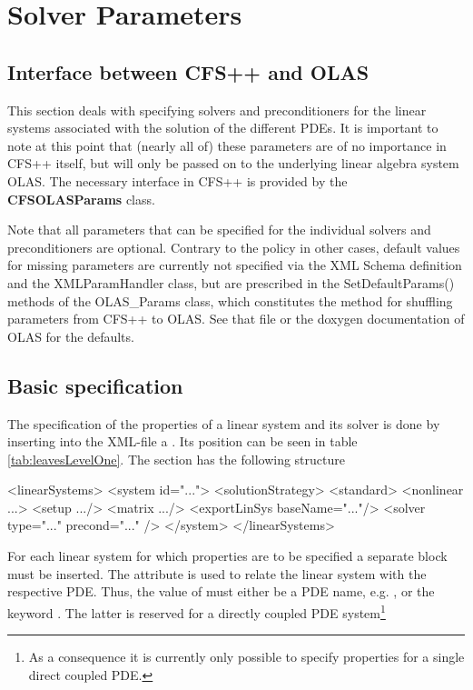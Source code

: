 %
%
\chapter{Solver Parameters}
%
%
\section{Interface between CFS++ and OLAS}
\label{sec:SP_Interface}
%
%
This section deals with specifying solvers and preconditioners for the linear
systems associated with the solution of the different PDEs. It is important to
note at this point that (nearly all of) these parameters are of no importance
in CFS++ itself, but will only be passed on to the underlying linear algebra
system OLAS. The necessary interface in CFS++ is provided by the 
\textbf{CFSOLASParams} class.

Note that all parameters that can be specified for the individual solvers and
preconditioners are optional. Contrary to the policy in other cases,
default values for missing parameters are currently not specified via the XML
Schema definition and the XMLParamHandler class, but are prescribed in the
SetDefaultParams() methods of the OLAS\_Params class, which constitutes the
method for shuffling parameters from CFS++ to OLAS. See that file or the
doxygen documentation of OLAS for the defaults.
%
%
\section{Basic specification}
%
%
The specification of the properties of a linear system and its solver is
done by inserting into the XML-file a . Its position can be
seen in table \ref{tab:leavesLevelOne}. The  section has
the following structure
%
%
\begin{xmllisting}
  <linearSystems>
    <system id="...">
       <solutionStrategy>
         <standard>
           <nonlinear ...>
           <setup .../>
           <matrix .../>
           <exportLinSys baseName="..."/>
           <solver type="..." precond="..." />
    </system>
  </linearSystems>
\end{xmllisting}
%
%
For each linear system for which properties are to be specified a separate
 block must be inserted. The  attribute is used to
relate the linear system with the respective PDE. Thus, the value of 
must either be a PDE name, e.g. , or the keyword
.
The latter is reserved for a directly coupled PDE system\footnote{As a
consequence it is currently only possible to specify properties for a single
direct coupled PDE.}

